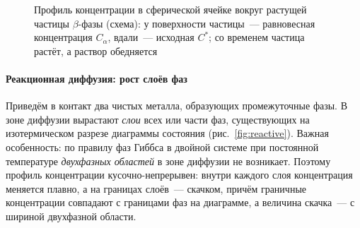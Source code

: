 \begin{figure}[ht]
\centering
{}
\caption{Профиль концентрации в сферической ячейке вокруг растущей
частицы $\beta$-фазы (схема): у поверхности частицы~— равновесная
концентрация $C_\alpha$, вдали~— исходная $C^*$; со временем частица
растёт, а раствор обедняется}
\label{fig:cell}
\end{figure}

\paragraph{Реакционная диффузия: рост слоёв фаз}
Приведём в контакт два чистых металла, образующих промежуточные фазы. В
зоне диффузии вырастают \emph{слои} всех или части фаз, существующих на
изотермическом разрезе диаграммы состояния (рис.~\ref{fig:reactive}).
Важная особенность: по правилу фаз Гиббса в двойной системе при
постоянной температуре \emph{двухфазных областей} в зоне диффузии не
возникает. Поэтому профиль концентрации кусочно-непрерывен: внутри
каждого слоя концентрация меняется плавно, а на границах слоёв~—
скачком, причём граничные концентрации совпадают с границами фаз на
диаграмме, а величина скачка~— с шириной двухфазной области.

